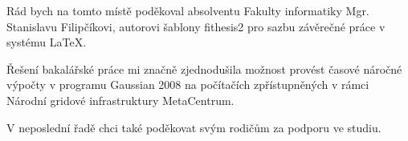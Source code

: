 \documentclass[11pt,draft,oneside]{fithesis2}
\begin{document}
\FrontMatter
\ThesisTitlePage

\begin{ThesisDeclaration}
  \DeclarationText
  \AdvisorName
\end{ThesisDeclaration}

\begin{ThesisThanks}
Rád bych na tomto místě poděkoval absolventu Fakulty informatiky Mgr. Stanislavu Filipčíkovi, autorovi šablony fithesis2 pro sazbu závěrečné práce v systému \LaTeX{}.

Řešení bakalářské práce mi značně zjednodušila možnost provést časové náročné výpočty v programu Gaussian 2008 na počítačích zpřístupněných v rámci Národní gridové infrastruktury MetaCentrum.

V neposlední řadě chci také poděkovat svým rodičům za podporu ve studiu.



\end{ThesisThanks}
\end{document}
